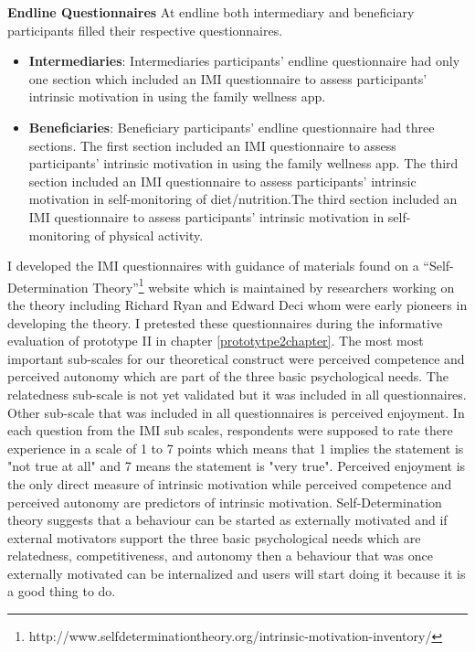 \textbf{Endline Questionnaires}
At endline both intermediary and beneficiary participants filled their respective questionnaires. 
\begin{itemize}
\item{\textbf{Intermediaries}}: Intermediaries participants' endline questionnaire had only one section which included an IMI questionnaire  to assess participants' intrinsic motivation in using the family wellness app.
\item{\textbf{Beneficiaries}}: Beneficiary participants' endline questionnaire had three sections. The first section included an IMI questionnaire  to assess participants' intrinsic motivation in using the family wellness app. The third section included an IMI questionnaire to assess participants' intrinsic motivation in self-monitoring of diet/nutrition.The third section included an IMI questionnaire to assess participants' intrinsic motivation in self-monitoring of physical activity.
\end{itemize}


I developed the IMI questionnaires with guidance of materials found on a ``Self-Determination Theory''\footnote{http://www.selfdeterminationtheory.org/intrinsic-motivation-inventory/} website which is maintained by researchers working on the theory including Richard Ryan and Edward Deci\citep{deci1985intrinsic} whom were early pioneers in developing the theory. I pretested these questionnaires during the informative evaluation of prototype II in chapter \ref{prototytpe2chapter}.  The most most important sub-scales for our theoretical construct were perceived competence and perceived autonomy which are part of the three basic psychological needs. The relatedness sub-scale is not yet validated but it was included in all questionnaires. Other sub-scale that was included in all questionnaires is perceived enjoyment. In each question from the IMI sub scales, respondents were supposed to rate there experience in a scale of 1 to 7 points which means that 1 implies the statement is "not true at all" and 7 means the statement is "very true". \newline
Perceived enjoyment is the only direct measure of intrinsic motivation while perceived competence and perceived autonomy are predictors of intrinsic motivation. Self-Determination theory suggests that a behaviour can be started as externally motivated and if external motivators support the three basic psychological needs which are relatedness, competitiveness, and autonomy then a behaviour that was once externally motivated can be internalized and users will start doing it because it is a good thing to do.

